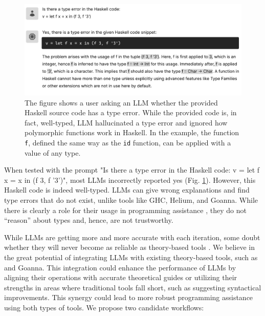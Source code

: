 \begin{figure}[hbt]
  \includegraphics[width=\linewidth]{LLM2}
  \caption[An example where LLM identified a type error in well-typed source code]{\label{fig:llm2}
  The figure shows a user asking an LLM whether the provided Haskell source code has a type error. While the provided code is, in fact, well-typed, LLM hallucinated a type error and ignored how polymorphic functions work in Haskell. In the example, the function \texttt{f},  defined the same way as the \texttt{id} function, can be applied with a value of any type.
    } 
\end{figure}

When tested with the prompt "Is there a type error in the Haskell code: v = let f x = x in (f 3, f '3')", most LLMs incorrectly reported yes (Fig. \ref{fig:llm2}). However, this Haskell code is indeed well-typed. LLMs can give wrong explanations and find type errors that do not exist, unlike tools like GHC, Helium, and Goanna. While there is clearly a role for their usage in programming assistance \cite{Lee2024-hs}, they do not “reason” about types and, hence, are not trustworthy.

While LLMs are getting more and more accurate with each iteration, some doubt whether they will never become as reliable as theory-based tools \cite{Berglund2023-ig}. We believe in the great potential of integrating LLMs with existing theory-based tools, such as \chameleon{} and Goanna. This integration could enhance the performance of LLMs by aligning their operations with accurate theoretical guides or utilizing their strengths in areas where traditional tools fall short, such as suggesting syntactical improvements. This synergy could lead to more robust programming assistance using both types of tools. We propose two candidate workflows:



